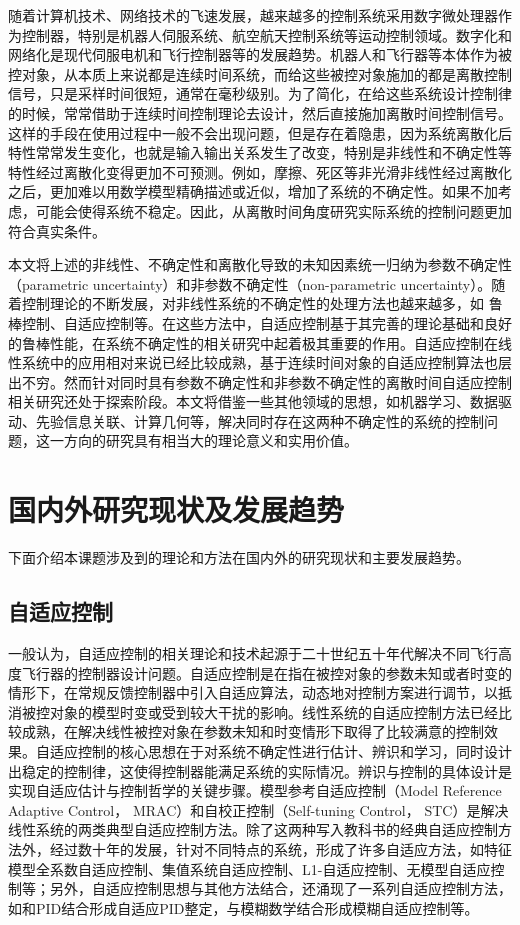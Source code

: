 随着计算机技术、网络技术的飞速发展，越来越多的控制系统采用数字微处理器作为控制器，特别是机器人伺服系统、航空航天控制系统等运动控制领域。数字化和网络化是现代伺服电机和飞行控制器等的发展趋势。机器人和飞行器等本体作为被控对象，从本质上来说都是连续时间系统，而给这些被控对象施加的都是离散控制信号，只是采样时间很短，通常在毫秒级别。为了简化，在给这些系统设计控制律的时候，常常借助于连续时间控制理论去设计，然后直接施加离散时间控制信号。这样的手段在使用过程中一般不会出现问题，但是存在着隐患，因为系统离散化后特性常常发生变化，也就是输入输出关系发生了改变，特别是非线性和不确定性等特性经过离散化变得更加不可预测。例如，摩擦、死区等非光滑非线性经过离散化之后，更加难以用数学模型精确描述或近似，增加了系统的不确定性。如果不加考虑，可能会使得系统不稳定。因此，从离散时间角度研究实际系统的控制问题更加符合真实条件。

本文将上述的非线性、不确定性和离散化导致的未知因素统一归纳为参数不确定性（parametric uncertainty）和非参数不确定性（non-parametric uncertainty）。随着控制理论的不断发展，对非线性系统的不确定性的处理方法也越来越多，如 鲁棒控制、自适应控制等。在这些方法中，自适应控制基于其完善的理论基础和良好的鲁棒性能，在系统不确定性的相关研究中起着极其重要的作用。自适应控制在线性系统中的应用相对来说已经比较成熟，基于连续时间对象的自适应控制算法也层出不穷。然而针对同时具有参数不确定性和非参数不确定性的离散时间自适应控制相关研究还处于探索阶段。本文将借鉴一些其他领域的思想，如机器学习、数据驱动、先验信息关联、计算几何等，解决同时存在这两种不确定性的系统的控制问题，这一方向的研究具有相当大的理论意义和实用价值。

\section{国内外研究现状及发展趋势}\label{sect:1.2}
下面介绍本课题涉及到的理论和方法在国内外的研究现状和主要发展趋势。
\subsection{自适应控制}%

一般认为，自适应控制的相关理论和技术起源于二十世纪五十年代解决不同飞行高度飞行器的控制器设计问题。自适应控制是在指在被控对象的参数未知或者时变的情形下，在常规反馈控制器中引入自适应算法，动态地对控制方案进行调节，以抵消被控对象的模型时变或受到较大干扰的影响。线性系统的自适应控制方法已经比较成熟，在解决线性被控对象在参数未知和时变情形下取得了比较满意的控制效果。自适应控制的核心思想在于对系统不确定性进行估计、辨识和学习，同时设计出稳定的控制律，这使得控制器能满足系统的实际情况。辨识与控制的具体设计是实现自适应估计与控制哲学的关键步骤。模型参考自适应控制（Model Reference Adaptive Control， MRAC）和自校正控制（Self-tuning Control， STC）是解决线性系统的两类典型自适应控制方法。除了这两种写入教科书的经典自适应控制方法外，经过数十年的发展，针对不同特点的系统，形成了许多自适应方法，如特征模型全系数自适应控制、集值系统自适应控制、L1-自适应控制、无模型自适应控制等；另外，自适应控制思想与其他方法结合，还涌现了一系列自适应控制方法，如和PID结合形成自适应PID整定，与模糊数学结合形成模糊自适应控制等。

